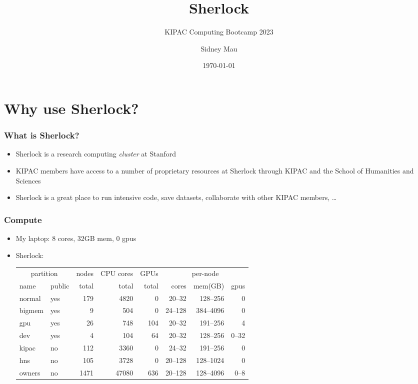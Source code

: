 \documentclass[aspectratio=169]{beamer}
\title{Sherlock}
\subtitle{KIPAC Computing Bootcamp 2023}
\author[S. Mau]{Sidney Mau}
\institute[Stanford]{Stanford University}
\date[\today]{\today}
\begin{document}

\frame{\titlepage}



\section{Why use Sherlock?}

\frame{\sectionpage}

\begin{frame}
	\frametitle{What is Sherlock?}
	\begin{itemize}
		\item Sherlock is a research computing \emph{cluster} at Stanford
		\item KIPAC members have access to a number of proprietary resources at Sherlock through KIPAC and the School of Humanities and Sciences
		\item Sherlock is a great place to run intensive code, save datasets, collaborate with other KIPAC members, \dots
	\end{itemize}
\end{frame}

\begin{frame}
	\frametitle{Compute}
	\begin{itemize}
		\item My laptop: 8 cores, 32GB mem, 0 gpus
		\item Sherlock:
			\begin{center}
				\begin{tabular}{|l|l||r|r|r||r|r|r|}
					\hline
					\multicolumn{2}{|c||}{partition} & nodes & CPU cores & GPUs & \multicolumn{3}{|c|}{per-node} \\
					name   & public & total & total & total &   cores &   mem(GB) &  gpus \\
					\hline
					normal & yes    &   179 &  4820 &     0 &  20--32 &  128--256 &     0 \\
					bigmem & yes    &     9 &   504 &     0 & 24--128 & 384--4096 &     0 \\
					gpu    & yes    &    26 &   748 &   104 &  20--32 &  191--256 &     4 \\
					dev    & yes    &     4 &   104 &    64 &  20--32 &  128--256 & 0--32 \\
					\hline
					kipac  & no     &   112 &  3360 &     0 &  24--32 &  191--256 &     0 \\
					hns    & no     &   105 &  3728 &     0 & 20--128 & 128--1024 &     0 \\
					\hline
					owners & no     &  1471 & 47080 &   636 & 20--128 & 128--4096 &  0--8 \\
					\hline
				\end{tabular}
			\end{center}
	\end{itemize}
\end{frame}
\end{document}
